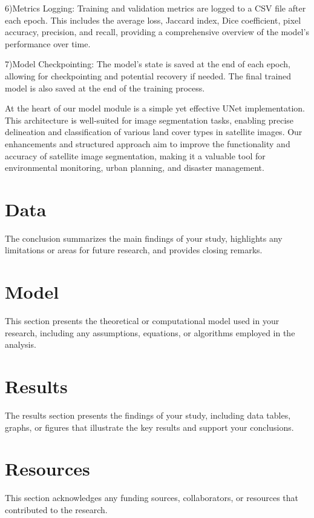 \documentclass{article}
\begin{document}
6)Metrics Logging:
Training and validation metrics are logged to a CSV file after each epoch. This includes the average loss, Jaccard index, Dice coefficient, pixel accuracy, precision, and recall, providing a comprehensive overview of the model's performance over time.

7)Model Checkpointing:
The model's state is saved at the end of each epoch, allowing for checkpointing and potential recovery if needed. The final trained model is also saved at the end of the training process.

At the heart of our model module is a simple yet effective UNet implementation. This architecture is well-suited for image segmentation tasks, enabling precise delineation and classification of various land cover types in satellite images. Our enhancements and structured approach aim to improve the functionality and accuracy of satellite image segmentation, making it a valuable tool for environmental monitoring, urban planning, and disaster management.
\section{Data}
\lipsum[3]
The conclusion summarizes the main findings of your study, highlights any limitations or areas for future research, and provides closing remarks.

\section{Model}
\lipsum[4]
This section presents the theoretical or computational model used in your research, including any assumptions, equations, or algorithms employed in the analysis.

\section{Results}
\lipsum[5]
The results section presents the findings of your study, including data tables, graphs, or figures that illustrate the key results and support your conclusions.

\section{Resources}
\lipsum[6]
This section acknowledges any funding sources, collaborators, or resources that contributed to the research.
\end{document}
